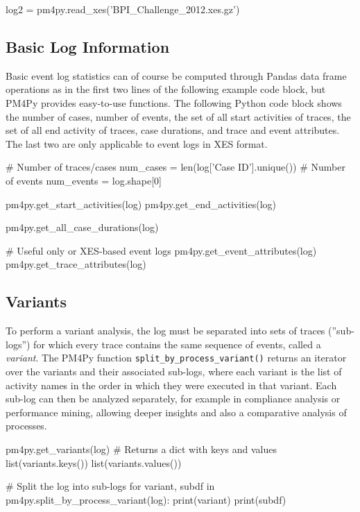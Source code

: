 \begin{pythoncode}
log2 = pm4py.read_xes('BPI_Challenge_2012.xes.gz')
\end{pythoncode}

\subsection*{Basic Log Information}

Basic event log statistics can of course be computed through Pandas data frame operations as in the first two lines of the following example code block, but PM4Py provides easy-to-use functions. The following Python code block shows the number of cases, number of events, the set of all start activities of traces, the set of all end activity of traces, case durations, and trace and event attributes. The last two are only applicable to event logs in XES format.

\begin{samepage}
\begin{pythoncode}
# Number of traces/cases
num_cases = len(log['Case ID'].unique())
# Number of events
num_events = log.shape[0]

pm4py.get_start_activities(log)
pm4py.get_end_activities(log)

pm4py.get_all_case_durations(log)

# Useful only or XES-based event logs
pm4py.get_event_attributes(log)
pm4py.get_trace_attributes(log)
\end{pythoncode}
\end{samepage}

\subsection*{Variants}

To perform a variant analysis, the log must be separated into sets of traces (''sub-logs'') for which every trace contains the same sequence of events, called a \emph{variant}. The PM4Py function \texttt{split\_by\_process\_variant()} returns an iterator over the variants and their associated sub-logs, where each variant is the list of activity names in the order in which they were executed in that variant. Each sub-log can then be analyzed separately, for example in compliance analysis or performance mining, allowing deeper insights and also a comparative analysis of processes.

\begin{samepage}
\begin{pythoncode}
pm4py.get_variants(log)
# Returns a dict with keys and values
list(variants.keys())
list(variants.values())

# Split the log into sub-logs
for variant, subdf in pm4py.split_by_process_variant(log):
    print(variant)
    print(subdf)  
\end{pythoncode}
\end{samepage}

